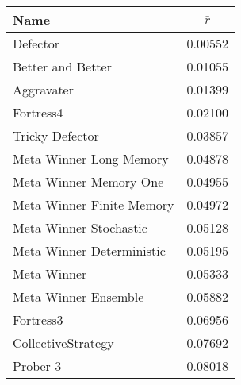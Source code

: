 \begin{tabular}{lc}
\toprule
Name                      &    $\bar{r}$\\
\midrule
Defector                  &    0.00552 \\
Better and Better         &    0.01055 \\
Aggravater                &    0.01399 \\
Fortress4                 &    0.02100 \\
Tricky Defector           &    0.03857 \\
Meta Winner Long Memory   &    0.04878 \\
Meta Winner Memory One    &    0.04955 \\
Meta Winner Finite Memory &    0.04972 \\
Meta Winner Stochastic    &    0.05128 \\
Meta Winner Deterministic &    0.05195 \\
Meta Winner               &    0.05333 \\
Meta Winner Ensemble      &    0.05882 \\
Fortress3                 &    0.06956 \\
CollectiveStrategy        &    0.07692 \\
Prober 3                  &    0.08018 \\
\bottomrule
\end{tabular}
